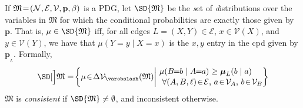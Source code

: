 \documentclass{article}
\theoremstyle{plain}
\theoremstyle{definition}
\theoremstyle{remark}
\newcommand\mat[1]{\mathbf{#1}}
\newcommand{\notation}[2][]{#1}
\renewcommand{\notation}[2][]{{\color{notationcolor} #2}}
\newcommand{\none}{\varobslash}
\def\sheq{\!=\!}
\newcommand{\bp}[1][L]{\mat{p}_{\!_{#1}\!}}
\newcommand{\V}{\mathcal V}
\newcommand{\Ed}{\mathcal E}
\newcommand{\dg}[1]{\mathfrak{#1}}
\newcommand{\MN}{PDG}
\numberwithin{equation}{section}
\begin{document}
	\begin{defn} \label{def:set-semantics} %
		If $\dg M\sheq\mnvars[]$ is a \MN, let $\SD{\dg M}$ be
                the \emph{s}et of \emph{d}istributions over the
                variables in $\dg M$ 
                for which the conditional probabilities are exactly 
                                those given by $\mat p$.
  That is, $\mu \in \SD{\dg M}$ iff, for all edges $L = (X,Y) \in 
                \Ed$,  $x \in \V(X)$,  and $y \in \V(Y)$, we have that
    $\mu(Y\sheq y \mid X\sheq x)$ is the $x,y$ entry in the cpd given by
                $\bp$.
		\notation{Formally,		
		\[ \SD[\Big]\dg M = \!\left\{\mu \!\in\! \Delta \V_\none (\dg M) \middle|\!
		\begin{array}{l}
		\mu(B\!\! =\!\!b \mid A\!\!=\!\!a) \geq \boldsymbol\mu_L(b \mid a) \\[0.1em]
		~\text{$\forall (A, B,\ell) \!\in\! \Ed$, $a \!\in\!\mathcal V_A$, $b \!\in\! \mathcal V_B$} \end{array}\!\!\! \right\}\]
		}
%
                $\dg M$ is
\emph{consistent} if 
$\SD{\dg M} \ne \emptyset$, and
inconsistent otherwise.
\end{defn}
\end{document}
